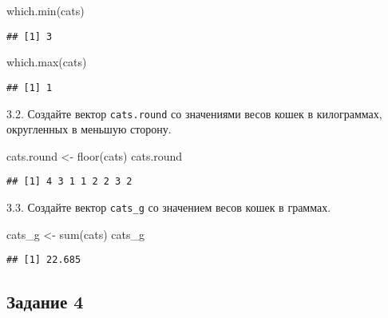 \documentclass[
]{article}
\newenvironment{Shaded}{\begin{snugshade}}{\end{snugshade}}
\newcommand{\FunctionTok}[1]{\textcolor[rgb]{0.00,0.00,0.00}{#1}}
\newcommand{\NormalTok}[1]{#1}
\newcommand{\OtherTok}[1]{\textcolor[rgb]{0.56,0.35,0.01}{#1}}
\begin{document}
\begin{Shaded}
\begin{Highlighting}[]
\FunctionTok{which.min}\NormalTok{(cats)}
\end{Highlighting}
\end{Shaded}

\begin{verbatim}
## [1] 3
\end{verbatim}

\begin{Shaded}
\begin{Highlighting}[]
\FunctionTok{which.max}\NormalTok{(cats)}
\end{Highlighting}
\end{Shaded}

\begin{verbatim}
## [1] 1
\end{verbatim}

3.2. Создайте вектор \texttt{cats.round} со значениями весов кошек в
килограммах, округленных в меньшую сторону.

\begin{Shaded}
\begin{Highlighting}[]
\NormalTok{cats.round }\OtherTok{\textless{}{-}} \FunctionTok{floor}\NormalTok{(cats)}
\NormalTok{cats.round}
\end{Highlighting}
\end{Shaded}

\begin{verbatim}
## [1] 4 3 1 1 2 2 3 2
\end{verbatim}

3.3. Создайте вектор \texttt{cats\_g} со значением весов кошек в
граммах.

\begin{Shaded}
\begin{Highlighting}[]
\NormalTok{cats\_g }\OtherTok{\textless{}{-}} \FunctionTok{sum}\NormalTok{(cats)}
\NormalTok{cats\_g}
\end{Highlighting}
\end{Shaded}

\begin{verbatim}
## [1] 22.685
\end{verbatim}

\hypertarget{ux437ux430ux434ux430ux43dux438ux435-4}{%
\subsection{Задание 4}\label{ux437ux430ux434ux430ux43dux438ux435-4}}
\end{document}
